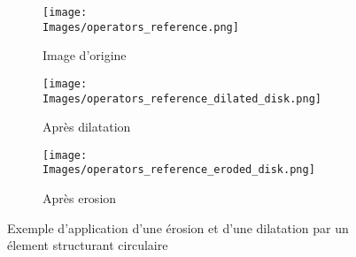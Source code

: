 \documentclass[\main/main.tex]{subfiles}
\begin{document}
\begin{figure}[h]
    \centering
    \begin{subfigure}[b]{0.30\textwidth}
       \caption{
       Image d'origine
            }
       \centering \texttt{[image: \\Images/operators\_reference.png]}
    \end{subfigure}
    \begin{subfigure}[b]{0.30\textwidth}
       \caption{
            Après dilatation
            }
       \centering \texttt{[image: \\Images/operators\_reference\_dilated\_disk.png]}
    \end{subfigure}
    \begin{subfigure}[b]{0.30\textwidth}
       \caption{
            Après erosion
            }
       \centering \texttt{[image: \\Images/operators\_reference\_eroded\_disk.png]}
    \end{subfigure}
    \caption{
        \label{fig:morpho:operateurs}
        Exemple d'application d'une érosion et d'une dilatation par un élement structurant circulaire
    }
    
\end{figure}
\end{document}

